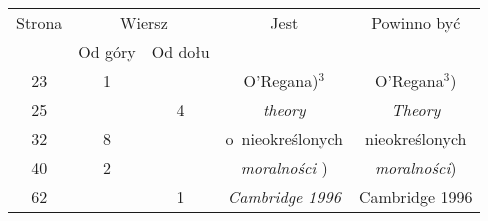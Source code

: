 \documentclass[a4paper,11pt]{article}
\numberwithin{equation}{section}
\begin{document}









\newpage



\begin{center}

  \begin{tabular}{|c|c|c|c|c|}
    \hline
    Strona & \multicolumn{2}{c|}{Wiersz} & Jest
                              & Powinno być \\ \cline{2-3}
    & Od góry & Od dołu & & \\
    \hline
    23  &  1 & & O’Regana)$^{ 3 }$ & O’Regana$^{ 3 }$) \\
    25  & &  4 & \textit{theory} & \textit{Theory} \\
    32  &  8 & & o~nieokreślonych & nieokreślonych \\
    40  &  2 & & \textit{moralności} ) & \textit{moralności}) \\
    62  & &  1 & \textit{Cambridge 1996} & Cambridge 1996  \\
    \hline
  \end{tabular}

\end{center}

\VerSpaceTwo














\end{document}
